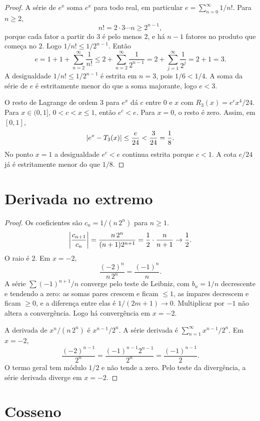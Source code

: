 \documentclass[11pt,a4paper]{article}
\begin{document}
\begin{proof}
A série de \(e^x\) soma \(e^x\) para todo real, em particular \(e=\sum_{n=0}^\infty 1/n!\). Para \(n\ge 2\),
\[
n!=2\cdot 3\cdots n\ge 2^{n-1},
\]
porque cada fator a partir do \(3\) é pelo menos \(2\), e há \(n-1\) fatores no produto que começa no \(2\). Logo \(1/n!\le 1/2^{n-1}\). Então
\[
e=1+1+\sum_{n=2}^\infty\frac{1}{n!}
\le 2+\sum_{n=2}^\infty\frac{1}{2^{n-1}}
=2+\sum_{j=1}^\infty\frac{1}{2^j}
=2+1=3.
\]
A desigualdade \(1/n!\le 1/2^{n-1}\) é estrita em \(n=3\), pois \(1/6<1/4\). A soma da série de \(e\) é estritamente menor do que a soma majorante, logo \(e<3\).

O resto de Lagrange de ordem \(3\) para \(e^x\) dá \(c\) entre \(0\) e \(x\) com \(R_3(x)=e^c x^4/24\). Para \(x\in(0,1]\), \(0<c<x\le 1\), então \(e^c<e\). Para \(x=0\), o resto é zero. Assim, em \([0,1]\),
\[
\left\lvert e^x-T_3(x) \right\rvert\le\frac{e}{24}<\frac{3}{24}=\frac{1}{8}.
\]
No ponto \(x=1\) a desigualdade \(e^c<e\) continua estrita porque \(c<1\). A cota \(e/24\) já é estritamente menor do que \(1/8\).
\end{proof}

\section{Derivada no extremo}

\begin{proof}
Os coeficientes são \(c_n=1/(n\,2^n)\) para \(n\ge 1\).
\[
\left\lvert \frac{c_{n+1}}{c_n} \right\rvert=\frac{n\,2^n}{(n+1)2^{n+1}}=\frac{1}{2}\cdot\frac{n}{n+1}\to\frac{1}{2}.
\]
O raio é \(2\). Em \(x=-2\),
\[
\frac{(-2)^n}{n\,2^n}=\frac{(-1)^n}{n}.
\]
A série \(\sum (-1)^{n+1}/n\) converge pelo teste de Leibniz, com \(b_n=1/n\) decrescente e tendendo a zero: as somas pares crescem e ficam \(\le 1\), as ímpares decrescem e ficam \(\ge 0\), e a diferença entre elas é \(1/(2m+1)\to 0\). Multiplicar por \(-1\) não altera a convergência. Logo há convergência em \(x=-2\).

A derivada de \(x^n/(n\,2^n)\) é \(x^{n-1}/2^n\). A série derivada é \(\sum_{n=1}^\infty x^{n-1}/2^n\). Em \(x=-2\),
\[
\frac{(-2)^{n-1}}{2^n}=\frac{(-1)^{n-1}2^{n-1}}{2^n}=\frac{(-1)^{n-1}}{2}.
\]
O termo geral tem módulo \(1/2\) e não tende a zero. Pelo teste da divergência, a série derivada diverge em \(x=-2\).
\end{proof}

\section{Cosseno}
\end{document}
